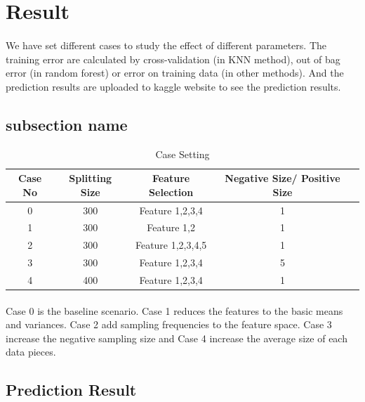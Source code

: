 \documentclass{article}
\begin{document}
	\section{Result} %
	\label{sec:result}
	\paragraph{} We have set different cases to study the effect of different parameters. The training error are calculated by cross-validation (in KNN method), out of bag error (in random forest) or error on training data (in other methods). And the prediction results are uploaded to kaggle website to see the prediction results. 
	
	\subsection{subsection name} %
	\label{sub:subsection_name}

	\begin{table}
		\centering
		\caption{Case Setting}
		\begin{tabular}{c|c|c|c|c}
			Case No & Splitting Size & Feature Selection & Negative Size/ Positive Size \\ \hline
			0 & 300 & Feature 1,2,3,4 & 1 \\
			1 & 300 & Feature 1,2     & 1  \\
			2 & 300 & Feature 1,2,3,4,5 & 1 \\
			3 & 300 & Feature 1,2,3,4 & 5  \\
			4 & 400 & Feature 1,2,3,4 & 1 \\
		\end{tabular}
	\end{table}
	
	\paragraph{}Case 0 is the baseline scenario. Case 1 reduces the features to the basic means and variances. Case 2 add sampling frequencies to the feature space. Case 3 increase the negative sampling size and Case 4 increase the average size of each data pieces.
	
	\subsection{Prediction Result} %
	\label{sub:prediction_result}
	
\end{document}
